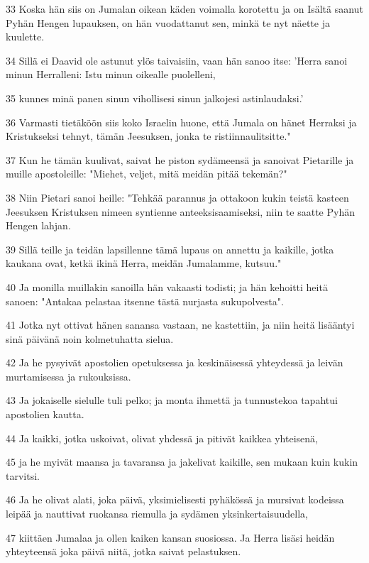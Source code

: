 \par 33 Koska hän siis on Jumalan oikean käden voimalla korotettu ja on Isältä saanut Pyhän Hengen lupauksen, on hän vuodattanut sen, minkä te nyt näette ja kuulette.
\par 34 Sillä ei Daavid ole astunut ylös taivaisiin, vaan hän sanoo itse: 'Herra sanoi minun Herralleni: Istu minun oikealle puolelleni,
\par 35 kunnes minä panen sinun vihollisesi sinun jalkojesi astinlaudaksi.'
\par 36 Varmasti tietäköön siis koko Israelin huone, että Jumala on hänet Herraksi ja Kristukseksi tehnyt, tämän Jeesuksen, jonka te ristiinnaulitsitte."
\par 37 Kun he tämän kuulivat, saivat he piston sydämeensä ja sanoivat Pietarille ja muille apostoleille: "Miehet, veljet, mitä meidän pitää tekemän?"
\par 38 Niin Pietari sanoi heille: "Tehkää parannus ja ottakoon kukin teistä kasteen Jeesuksen Kristuksen nimeen syntienne anteeksisaamiseksi, niin te saatte Pyhän Hengen lahjan.
\par 39 Sillä teille ja teidän lapsillenne tämä lupaus on annettu ja kaikille, jotka kaukana ovat, ketkä ikinä Herra, meidän Jumalamme, kutsuu."
\par 40 Ja monilla muillakin sanoilla hän vakaasti todisti; ja hän kehoitti heitä sanoen: "Antakaa pelastaa itsenne tästä nurjasta sukupolvesta".
\par 41 Jotka nyt ottivat hänen sanansa vastaan, ne kastettiin, ja niin heitä lisääntyi sinä päivänä noin kolmetuhatta sielua.
\par 42 Ja he pysyivät apostolien opetuksessa ja keskinäisessä yhteydessä ja leivän murtamisessa ja rukouksissa.
\par 43 Ja jokaiselle sielulle tuli pelko; ja monta ihmettä ja tunnustekoa tapahtui apostolien kautta.
\par 44 Ja kaikki, jotka uskoivat, olivat yhdessä ja pitivät kaikkea yhteisenä,
\par 45 ja he myivät maansa ja tavaransa ja jakelivat kaikille, sen mukaan kuin kukin tarvitsi.
\par 46 Ja he olivat alati, joka päivä, yksimielisesti pyhäkössä ja mursivat kodeissa leipää ja nauttivat ruokansa riemulla ja sydämen yksinkertaisuudella,
\par 47 kiittäen Jumalaa ja ollen kaiken kansan suosiossa. Ja Herra lisäsi heidän yhteyteensä joka päivä niitä, jotka saivat pelastuksen.

